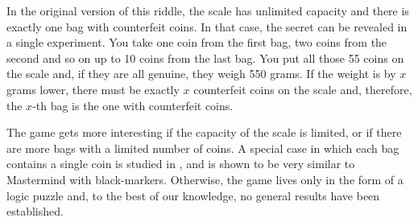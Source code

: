 In the original version of this riddle, the scale has unlimited capacity and
  there is exactly one bag with counterfeit coins.
In that case, the secret can be revealed in a single experiment.
You take one coin from the first bag, two coins from the second and so on up to
  10 coins from the last bag.
You put all those 55 coins on the scale and, if they are all genuine,
  they weigh 550 grams.
If the weight is by $x$ grams lower, there must be exactly $x$ counterfeit
  coins on the scale and, therefore,
  the $x$-th bag is the one with counterfeit coins.

The game gets more interesting if the capacity of the scale is limited, or
  if there are more bags with a limited number of coins.
A special case in which each bag contains a single coin is
  studied in \cite{erdos-two}, and is shown to be very similar to
  Mastermind with black-markers.
Otherwise, the game lives only in the form of a logic puzzle and,
  to the best of our knowledge, no general results have been established.
